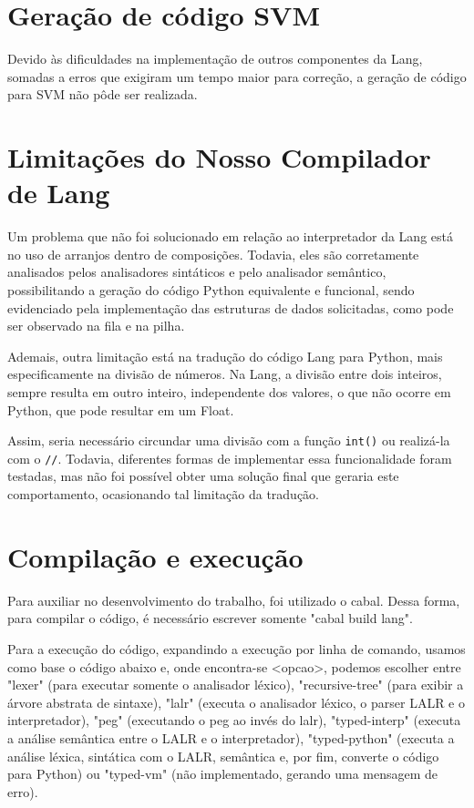 \documentclass{article}
\begin{document}
\section{Geração de código SVM}

    Devido às dificuldades na implementação de outros componentes da Lang, somadas a erros que exigiram um tempo maior para correção, a geração de código para SVM não pôde ser realizada.

\section{Limitações do Nosso Compilador de Lang}

    Um problema que não foi solucionado em relação ao interpretador da Lang está no uso de arranjos dentro de composições. Todavia, eles são corretamente analisados pelos analisadores sintáticos e pelo analisador semântico, possibilitando a geração do código Python equivalente e funcional, sendo evidenciado pela implementação das estruturas de dados solicitadas, como pode ser observado na fila e na pilha.

    Ademais, outra limitação está na tradução do código Lang para Python, mais especificamente na divisão de números. Na Lang, a divisão entre dois inteiros, sempre resulta em outro inteiro, independente dos valores, o que não ocorre em Python, que pode resultar em um Float. 

    Assim, seria necessário circundar uma divisão com a função \verb|int()| ou realizá-la com o \verb|//|. Todavia, diferentes formas de implementar essa funcionalidade foram testadas, mas não foi possível obter uma solução final que geraria este comportamento, ocasionando tal limitação da tradução.

\section{Compilação e execução}
    Para auxiliar no desenvolvimento do trabalho, foi utilizado o cabal. Dessa forma, para compilar o código, é necessário escrever somente "cabal build lang".

    Para a execução do código, expandindo a execução por linha de comando, usamos como base o código abaixo e, onde encontra-se <opcao>, podemos escolher entre "lexer" (para executar somente o analisador léxico), "recursive-tree" (para exibir a árvore abstrata de sintaxe), "lalr" (executa o analisador léxico, o parser LALR e o interpretador), "peg" (executando o peg ao invés do lalr), "typed-interp" (executa a análise semântica entre o LALR e o interpretador), "typed-python" (executa a análise léxica, sintática com o LALR, semântica e, por fim, converte o código para Python) ou "typed-vm" (não implementado, gerando uma mensagem de erro). 
\end{document}
